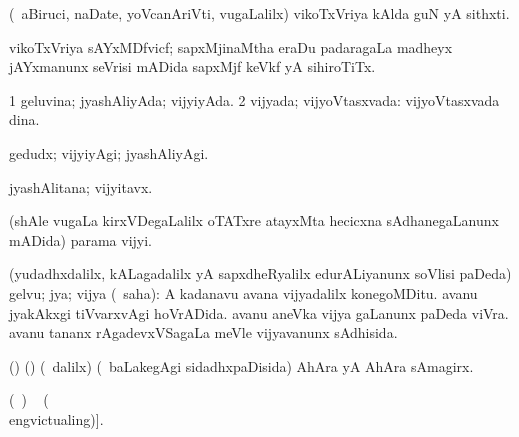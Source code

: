 {{{{{\bentry
{} 
\gl{\nA}
\expl{}
\bmng
 (\kanmu\ aBiruci, naDate, yoVcanAriVti, \mo vugaLalilx) vikoTxVriya kAlda guN yA sithxti. 
\emng
\eentry

\bentry
{}
\gl{\nA}
\expl{}
\bmng
\emng
\eentry

\bentry
{}
\gl{\nA}
\expl{}
\bmng
 vikoTxVriya sAYxMDfvicf; sapxMjinaMtha eraDu padaragaLa madheyx jAYxmanunx seVrisi mADida sapxMjf keVkf yA sihiroTiTx. 
\emng
\eentry

\bentry
{}
\gl{\nA}
\expl{}
\bmng
\emng
\eentry

\bentry
{} 
\gl{\gu}
\expl{}
\bmng
\bnum
\num{1} geluvina; jyashAliyAda; vijyiyAda. 
\num{2} vijyada; vijyoVtasxvada:  vijyoVtasxvada dina. 
\enum
\emng
\eentry

\bentry
{} 
\gl{\kirxvi}
\expl{}
\bmng
 gedudx; vijyiyAgi; jyashAliyAgi. 
\emng
\eentry

\bentry
{} 
\gl{\nA}
\expl{}
\bmng
 jyashAlitana; vijyitavx. 
\emng
\eentry

\bentry
{} 
\gl{\nA}
\expl{}
\bmng
 (shAle \mo vugaLa kirxVDegaLalilx oTATxre atayxMta hecicxna sAdhanegaLanunx mADida) parama vijyi. 
\emng
\eentry

\bentry
{} 
\gl{\nA}
\bmng
 (yudadhxdalilx, kALagadalilx yA sapxdheRyalilx edurALiyanunx soVlisi paDeda) gelvu; jya; vijya (\rUpa\ saha):  A kadanavu avana vijyadalilx konegoMDitu.  avanu jyakAkxgi tiVvarxvAgi hoVrADida.  avanu aneVka vijya gaLanunx paDeda viVra.  avanu tananx rAgadevxVSagaLa meVle vijyavanunx sAdhisida. 
\emng
\eentry

\bentry
{} 
\gl{\nA}
\expl{}
\bmng
 (\birx) (\aupa) (\sA\ \bava dalilx) (\kanmu\ baLakegAgi sidadhxpaDisida) AhAra yA AhAra sAmagirx. 
\emng
\eentry

\bentry
{} 
\gl{\kirx}
\expl{[\BU\ matutx \BUkaq\ \eng{victualled} }
(\ame\ )\eng{;} \vakaq\  (\ame\\eng{victualing})]. 

}}}}}
